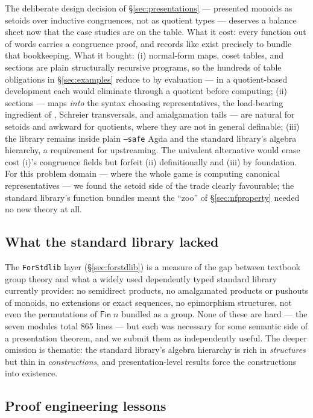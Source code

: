 The deliberate design decision of \S\ref{sec:presentations} --- presented
monoids as setoids over inductive congruences, not as quotient types ---
deserves a balance sheet now that the case studies are on the table.
What it cost: every function out of words carries a congruence proof, and
records like  exist precisely to bundle that bookkeeping.
What it bought: (i) normal-form maps, coset tables, and sections are
plain structurally recursive programs, so the hundreds of table
obligations in \S\ref{sec:examples} reduce to  by evaluation
--- in a quotient-based development each would eliminate through a
quotient before computing; (ii) sections --- maps \emph{into} the syntax
choosing representatives, the load-bearing ingredient of
, Schreier transversals, and amalgamation tails --- are
natural for setoids and awkward for quotients, where they are not in
general definable; (iii) the library remains inside plain
\texttt{--safe} Agda and the standard library's algebra hierarchy, a
requirement for upstreaming.  The univalent alternative
\cite{vezzosi2019cubical,cubicallibrary} would erase cost (i)'s
congruence fields but forfeit (ii) definitionally and (iii) by
foundation.  For this problem domain --- where the whole game is
computing canonical representatives --- we found the setoid side of the
trade clearly favourable; the standard library's function bundles meant
the ``zoo'' of \S\ref{sec:nfproperty} needed no new theory at all.

\subsection{What the standard library lacked}

The \texttt{ForStdlib} layer (\S\ref{sec:forstdlib}) is a measure of the
gap between textbook group theory and what a widely used dependently
typed standard library currently provides: no semidirect products, no
amalgamated products or pushouts of monoids, no extensions or exact
sequences, no epimorphism structures, not even the permutations of
$\mathsf{Fin}\;n$ bundled as a group.  None of these are hard --- the
seven modules total 865 lines --- but each was necessary for some
semantic side of a presentation theorem, and we submit them as
independently useful.  The deeper omission is thematic: the standard
library's algebra hierarchy is rich in \emph{structures} but thin in
\emph{constructions}, and presentation-level results force the
constructions into existence.

\subsection{Proof engineering lessons}

